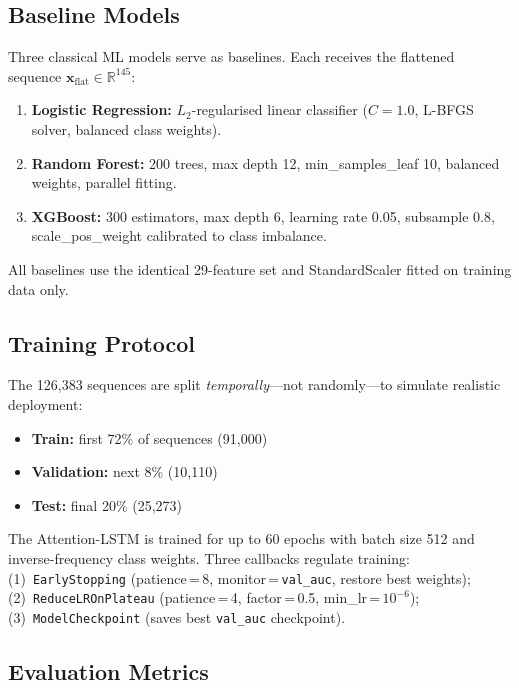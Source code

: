 \documentclass[conference]{IEEEtran}
\begin{document}
\subsection{Baseline Models}

Three classical ML models serve as baselines.  Each receives the flattened
sequence $\mathbf{x}_{\text{flat}} \in \mathbb{R}^{145}$:

\begin{enumerate}
    \item \textbf{Logistic Regression:} $L_2$-regularised linear
          classifier ($C\!=\!1.0$, L-BFGS solver, balanced class weights).
    \item \textbf{Random Forest:} 200 trees, max depth 12,
          min\_samples\_leaf 10, balanced weights, parallel fitting.
    \item \textbf{XGBoost:} 300 estimators, max depth 6,
          learning rate 0.05, subsample 0.8, scale\_pos\_weight
          calibrated to class imbalance.
\end{enumerate}

All baselines use the identical 29-feature set and StandardScaler fitted
on training data only.

\subsection{Training Protocol}

The 126{,}383 sequences are split \textit{temporally}—not randomly—to
simulate realistic deployment:

\begin{itemize}
    \item \textbf{Train:} first 72\% of sequences (91{,}000)
    \item \textbf{Validation:} next 8\% (10{,}110)
    \item \textbf{Test:} final 20\% (25{,}273)
\end{itemize}

The Attention-LSTM is trained for up to 60 epochs with batch size 512
and inverse-frequency class weights.  Three callbacks regulate training:
(1)~\texttt{EarlyStopping} (patience\,=\,8, monitor\,=\,\texttt{val\_auc},
restore best weights); (2)~\texttt{ReduceLROnPlateau} (patience\,=\,4,
factor\,=\,0.5, min\_lr\,=\,$10^{-6}$); (3)~\texttt{ModelCheckpoint}
(saves best \texttt{val\_auc} checkpoint).

\subsection{Evaluation Metrics}
\end{document}
